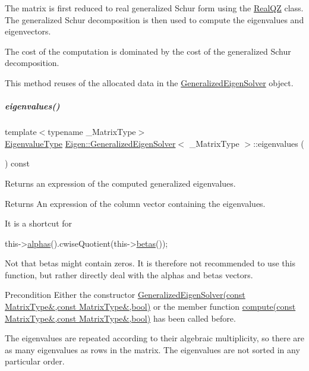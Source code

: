 The matrix is first reduced to real generalized Schur form using the \hyperlink{group___eigenvalues___module_class_eigen_1_1_real_q_z}{Real\+QZ} class. The generalized Schur decomposition is then used to compute the eigenvalues and eigenvectors.

The cost of the computation is dominated by the cost of the generalized Schur decomposition.

This method reuses of the allocated data in the \hyperlink{group___eigenvalues___module_class_eigen_1_1_generalized_eigen_solver}{Generalized\+Eigen\+Solver} object. \mbox{\label{group___eigenvalues___module_a62f01cd78271efd5e39bcb24e0fe1a58}} 
\subparagraph{\texorpdfstring{eigenvalues()}{eigenvalues()}\hspace{0.1cm}{\footnotesize\ttfamily [1/2]}}
{\footnotesize\ttfamily template$<$typename \+\_\+\+Matrix\+Type$>$ \\
\hyperlink{group___eigenvalues___module_ad59af178acc401f1bc4e330ef80f286d}{Eigenvalue\+Type} \hyperlink{group___eigenvalues___module_class_eigen_1_1_generalized_eigen_solver}{Eigen\+::\+Generalized\+Eigen\+Solver}$<$ \+\_\+\+Matrix\+Type $>$\+::eigenvalues (\begin{DoxyParamCaption}{ }\end{DoxyParamCaption}) const\hspace{0.3cm}{\ttfamily [inline]}}



Returns an expression of the computed generalized eigenvalues. 

\begin{DoxyReturn}{Returns}
An expression of the column vector containing the eigenvalues.
\end{DoxyReturn}
It is a shortcut for
\begin{DoxyCode}
this->\hyperlink{group___eigenvalues___module_a82b1bc41267f46e5c5899d5b084a73bb}{alphas}().cwiseQuotient(this->\hyperlink{group___eigenvalues___module_abeaa6f56cee367b83fd09d428462ca0c}{betas}()); 
\end{DoxyCode}
 Not that betas might contain zeros. It is therefore not recommended to use this function, but rather directly deal with the alphas and betas vectors.

\begin{DoxyPrecond}{Precondition}
Either the constructor \hyperlink{group___eigenvalues___module_a2a3528cbf75f66d3a60af9dc7b12ff65}{Generalized\+Eigen\+Solver(const Matrix\+Type\&,const Matrix\+Type\&,bool)} or the member function \hyperlink{group___eigenvalues___module_a275910b47dfe5f40211dcb59cfd68f3c}{compute(const Matrix\+Type\&,const Matrix\+Type\&,bool)} has been called before.
\end{DoxyPrecond}
The eigenvalues are repeated according to their algebraic multiplicity, so there are as many eigenvalues as rows in the matrix. The eigenvalues are not sorted in any particular order.

